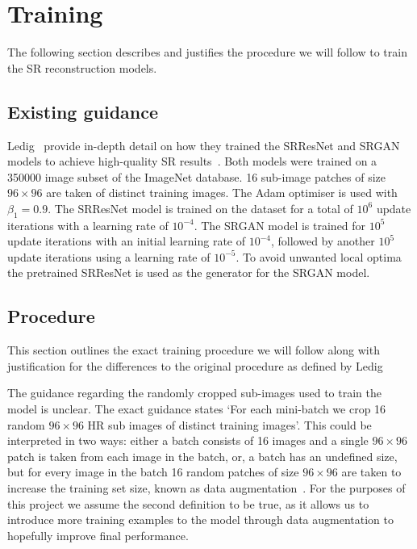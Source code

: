 \section{Training}
The following section describes and justifies the procedure we will follow to train the SR reconstruction models.

\subsection{Existing guidance}
Ledig \etal\ provide in-depth detail on how they trained the SRResNet and SRGAN models to achieve high-quality SR results~\cite{srgan}. Both models were trained on a 350000 image subset of the ImageNet database. 16 sub-image patches of size $96 \times 96$ are taken of distinct training images. The Adam optimiser is used with $\beta_1 = 0.9$. The SRResNet model is trained on the dataset for a total of $10^6$ update iterations with a learning rate of $10^{-4}$. The SRGAN model is trained for $10^5$ update iterations with an initial learning rate of $10^{-4}$, followed by another $10^5$ update iterations using a learning rate of $10^{-5}$. To avoid unwanted local optima the pretrained SRResNet is used as the generator for the SRGAN model.

\subsection{Procedure}\label{subsec:procedure}
This section outlines the exact training procedure we will follow along with justification for the differences to the original procedure as defined by Ledig \etal

The guidance regarding the randomly cropped sub-images used to train the model is unclear. The exact guidance states `For each mini-batch we crop 16 random $96 \times 96$ HR sub images of distinct training images'. This could be interpreted in two ways: either a batch consists of 16 images and a single $96 \times 96$ patch is taken from each image in the batch, or, a batch has an undefined size, but for every image in the batch 16 random patches of size $96 \times 96$ are taken to increase the training set size, known as data augmentation~\cite{dataAugmentation}. For the purposes of this project we assume the second definition to be true, as it allows us to introduce more training examples to the model through data augmentation to hopefully improve final performance.

